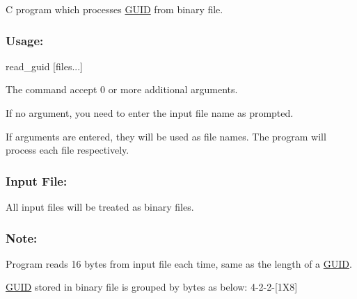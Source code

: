 C program which processes \hyperlink{structGUID}{G\-U\-I\-D} from binary file.

\subsubsection*{Usage\-:}

{\ttfamily read\-\_\-guid \mbox{[}files...\mbox{]}}

The command accept 0 or more additional arguments.

If no argument, you need to enter the input file name as prompted.

If arguments are entered, they will be used as file names. The program will process each file respectively.

\subsubsection*{Input File\-:}

All input files will be treated as binary files.

\subsubsection*{Note\-:}

Program reads 16 bytes from input file each time, same as the length of a \hyperlink{structGUID}{G\-U\-I\-D}.

\hyperlink{structGUID}{G\-U\-I\-D} stored in binary file is grouped by bytes as below\-: 4-\/2-\/2-\/\mbox{[}1\-X8\mbox{]} 